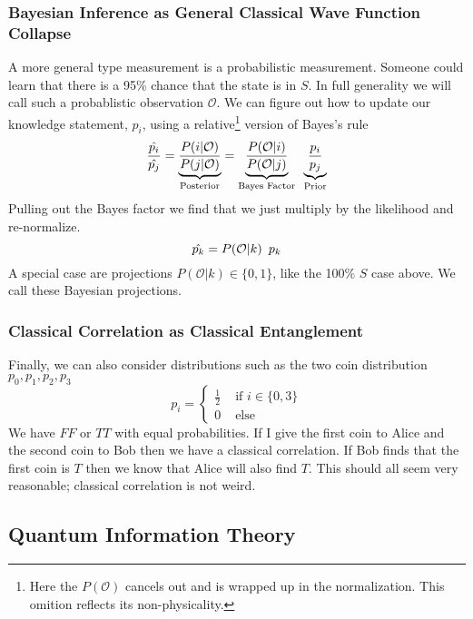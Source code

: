 \documentclass[12pt,a4paper]{article}
\begin{document}
\subsubsection{Bayesian Inference as General Classical Wave Function Collapse}
A more general type measurement is a probabilistic measurement.  Someone could learn that there is a 95\% chance that the state is in $S$.  In full generality we will call such a probablistic observation $\mathcal{O}$.  We can figure out how to update our knowledge statement, $p_i$, using a relative\footnote{Here the $P(\mathcal{O})$ cancels out and is wrapped up in the normalization. This omition reflects its non-physicality.} version of Bayes's rule
\[
  \frac{\hat{p_i}}{\hat{p_j}} = \underbrace{\frac{P(i | \mathcal{O})}{P(j | \mathcal{O})}}_\text{Posterior}
                              = \underbrace{\frac{P(\mathcal{O} | i)}{P(\mathcal{O}|j)}}_\text{Bayes Factor}  \hspace{0.07 in}  \underbrace{\frac{p_i}{p_j}}_\text{Prior}
\]
Pulling out the Bayes factor we find that we just multiply by the likelihood and re-normalize.
\[
  \hat{p_k} =  P(\mathcal{O} | k) \hspace{0.07 in} p_k
\]
A special case are projections $P(\mathcal{O} | k) \in \{0,1\}$, like the 100\% $S$ case above.  We call these Bayesian projections.

\subsubsection{Classical Correlation as Classical Entanglement}
Finally, we can also consider distributions such as the two coin distribution $p_0,p_1,p_2,p_3$
\[
p_i = 
\left\{
\begin{split}
\frac{1}{2} & \mbox{ if } i \in \{0,3\}\\
0 &\mbox{ else }
\end{split}
\right.
\]
We have $FF$ or $TT$ with equal probabilities.  If I give the first coin to Alice and the second coin to Bob then we have a classical correlation.  If Bob finds that the first coin is $T$ then we know that Alice will also find $T$.  This should all seem very reasonable; classical correlation is not weird.

\subsection{Quantum Information Theory}
\end{document}
